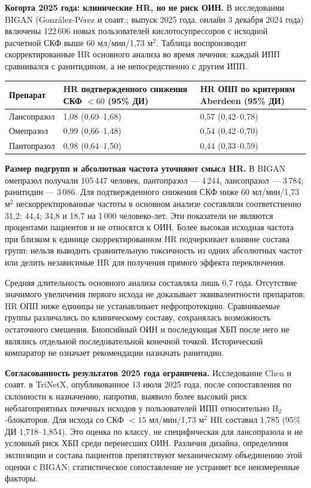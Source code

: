 \documentclass[11pt,a4paper,notitlepage]{report}
\newcommand{\src}[1]{\unskip\space\cite{#1}}
\begin{document}
\textbf{Когорта 2025 года: клинические HR, но не риск ОИН.} В исследовании BIGAN (González-Pérez и соавт.; выпуск 2025 года, онлайн 3 декабря 2024 года) включены 122\,606 новых пользователей кислотосупрессоров с исходной расчетной СКФ выше 60 мл/мин/1,73 м$^2$. Таблица воспроизводит скорректированные HR основного анализа во время лечения; каждый ИПП сравнивался с ранитидином, а не непосредственно с другим ИПП.\src{renalbigan2025}
\begin{longtable}{P{0.22\textwidth}P{0.34\textwidth}P{0.35\textwidth}}
\toprule
Препарат & HR подтвержденного снижения СКФ $<60$ (95\% ДИ) & HR ОПП по критериям Aberdeen (95\% ДИ) \\
\midrule
\endhead
Лансопразол & 1,08 (0,69--1,68) & 0,57 (0,42--0,78) \\
Омепразол & 0,99 (0,66--1,48) & 0,54 (0,42--0,70) \\
Пантопразол & 0,98 (0,64--1,50) & 0,44 (0,33--0,59) \\
\bottomrule
\end{longtable}
\textbf{Размер подгрупп и абсолютная частота уточняют смысл HR.} В BIGAN омепразол получали 105\,447 человек, пантопразол --- 4\,244, лансопразол --- 3\,784; ранитидин --- 3\,086. Для подтвержденного снижения СКФ ниже 60 мл/мин/1,73 м$^2$ нескорректированные частоты в основном анализе составляли соответственно 31,2; 44,4; 34,8 и 18,7 на 1\,000 человеко-лет. Эти показатели не являются процентами пациентов и не относятся к ОИН. Более высокая исходная частота при близком к единице скорректированном HR подчеркивает влияние состава групп: нельзя выводить сравнительную токсичность из одних абсолютных частот или делить независимые HR для получения прямого эффекта переключения.\src{renalbigan2025}

Средняя длительность основного анализа составляла лишь 0,7 года. Отсутствие значимого увеличения первого исхода не доказывает эквивалентности препаратов; HR ОПП ниже единицы не устанавливает нефропротекцию. Сравниваемые группы различались по клиническому составу, сохранялась возможность остаточного смешения. Биопсийный ОИН и последующая ХБП после него не являлись отдельной последовательной конечной точкой. Исторический компаратор не означает рекомендации назначать ранитидин.\src{renalbigan2025}

\textbf{Согласованность результатов 2025 года ограничена.} Исследование Chen и соавт. в TriNetX, опубликованное 13 июля 2025 года, после сопоставления по склонности к назначению, напротив, выявило более высокий риск неблагоприятных почечных исходов у пользователей ИПП относительно H$_2$-блокаторов. Для исхода со СКФ $<15$ мл/мин/1,73 м$^2$ HR составил 1,785 (95\% ДИ 1,718--1,854). Это оценка по классу, не специфическая для лансопразола и не условный риск ХБП среди перенесших ОИН. Различия дизайна, определения экспозиции и состава пациентов препятствуют механическому объединению этой оценки с BIGAN; статистическое сопоставление не устраняет все неизмеренные факторы.\src{renaltrinetx2025}
\end{document}
